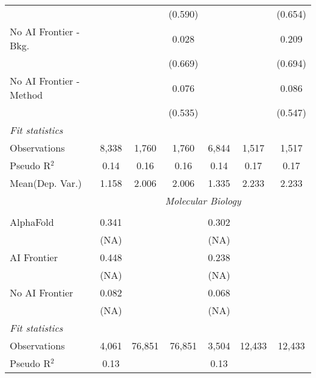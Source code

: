 \begin{tabular}{lcccccc}
                           &               &         & (0.590)      &         &         & (0.654)\\   
   No AI Frontier - Bkg.   &               &         & 0.028        &         &         & 0.209\\   
                           &               &         & (0.669)      &         &         & (0.694)\\   
   No AI Frontier - Method &               &         & 0.076        &         &         & 0.086\\   
                           &               &         & (0.535)      &         &         & (0.547)\\   
   \midrule
   \emph{Fit statistics}\\
   Observations            & 8,338         & 1,760   & 1,760        & 6,844   & 1,517   & 1,517\\  
   Pseudo R$^2$            & 0.14          & 0.16    & 0.16         & 0.14    & 0.17    & 0.17\\  
Mean(Dep. Var.) & 1.158 & 2.006 & 2.006 & 1.335 & 2.233 & 2.233 \\
   
 & \multicolumn{6}{c}{\textit{Molecular Biology}} \\ \\
   AlphaFold      & 0.341      &        &        & 0.302     &        &   \\   
                  & (NA)       &        &        & (NA)      &        &   \\   
   AI Frontier    & 0.448      &        &        & 0.238     &        &   \\   
                  & (NA)       &        &        & (NA)      &        &   \\   
   No AI Frontier & 0.082      &        &        & 0.068     &        &   \\   
                  & (NA)       &        &        & (NA)      &        &   \\   
   \midrule
   \emph{Fit statistics}\\
   Observations   & 4,061      & 76,851 & 76,851 & 3,504     & 12,433 & 12,433\\  
   Pseudo R$^2$   & 0.13       &        &        & 0.13      &        & \\  
   

\end{tabular}
